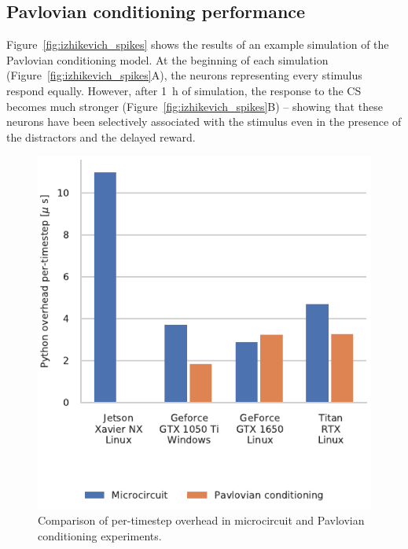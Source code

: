 \documentclass[utf8]{frontiersSCNS} %
\begin{document}
\subsection{Pavlovian conditioning performance}
Figure~\ref{fig:izhikevich_spikes} shows the results of an example simulation of the Pavlovian conditioning model.
At the beginning of each simulation (Figure~\ref{fig:izhikevich_spikes}A), the neurons representing every stimulus respond equally.
However, after \SI{1}{\hour} of simulation, the response to the CS becomes much stronger (Figure~\ref{fig:izhikevich_spikes}B) -- showing that these neurons have been selectively associated with the stimulus even in the presence of the distractors and the delayed reward.
%
\begin{figure}[t!]
    \begin{center}
        \includegraphics{figures/compare_overhead.pdf}
    \end{center}
    \caption{Comparison of per-timestep overhead in microcircuit and Pavlovian conditioning experiments.}
    \label{fig:compare_overhead}
\end{figure}
\end{document}
